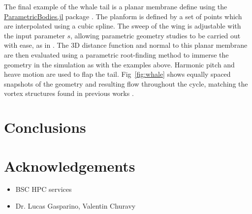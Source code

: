 \documentclass[final,3p,times]{elsarticle}
\begin{document}
The final example of the whale tail is a planar membrane define using the \href{https://github.com/WaterLily-jl/ParametricBodies.jl}{ParametricBodies.jl} package \cite{WeymouthLauber2023}. The planform is defined by a set of points which are interpolated using a cubic spline. The sweep of the wing is adjustable with the input parameter $s$, allowing parametric geometry studies to be carried out with ease, as in \cite{zurman2021}. The 3D distance function and normal to this planar membrane are then evaluated using a parametric root-finding method to immerse the geometry in the simulation as with the examples above. Harmonic pitch and heave motion are used to flap the tail. Fig~\ref{fig:whale} shows equally spaced snapshots of the geometry and resulting flow throughout the cycle, matching the vortex structures found in previous works \cite{zurman2021}.

\section{Conclusions}\label{sec:conclusions}

\section{Acknowledgements}\label{sec:acknowledgements}
\begin{itemize}
    \item BSC HPC services
    \item Dr. Lucas Gasparino, Valentin Churavy
\end{itemize}



\end{document}
